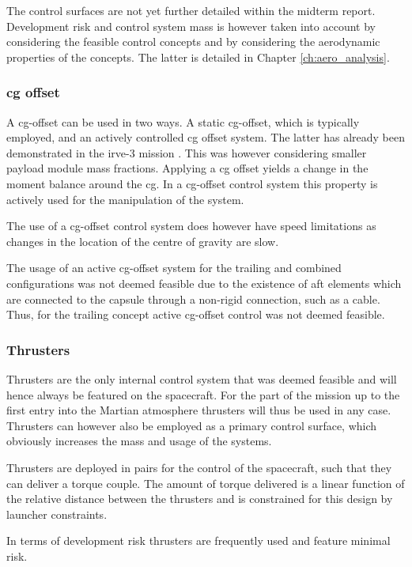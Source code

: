 The control surfaces are not yet further detailed within the midterm report. Development risk and control system mass is however taken into account by considering the feasible control concepts and by considering the aerodynamic properties of the concepts. The latter is detailed in Chapter \ref{ch:aero_analysis}.

\subsubsection{\gls{cg} offset}
A \acrfull{cg}-offset can be used in two ways. A static \gls{cg}-offset, which is typically employed, and an actively controlled \gls{cg} offset system. The latter has already been demonstrated in the \gls{irve}-3 mission \cite{Dillman2012}. This was however considering smaller payload module mass fractions. Applying a \gls{cg} offset yields a change in the moment balance around the \gls{cg}. In a \gls{cg}-offset control system this property is actively used for the manipulation of the system. 

The use of a \gls{cg}-offset control system does however have speed limitations as changes in the location of the centre of gravity are slow.

The usage of an active \gls{cg}-offset system for the trailing and combined configurations was not deemed feasible due to the existence of aft elements which are connected to the capsule through a non-rigid connection, such as a cable. Thus, for the trailing concept active \gls{cg}-offset control was not deemed feasible.

\subsubsection{Thrusters}
Thrusters are the only internal control system that was deemed feasible and will hence always be featured on the spacecraft. For the part of the mission up to the first entry into the Martian atmosphere thrusters will thus be used in any case. Thrusters can however also be employed as a primary control surface, which obviously increases the mass and usage of the systems.

Thrusters are deployed in pairs for the control of the spacecraft, such that they can deliver a torque couple. The amount of torque delivered is a linear function of the relative distance between the thrusters and is constrained for this design by launcher constraints. 

In terms of development risk thrusters are frequently used and feature minimal risk.

